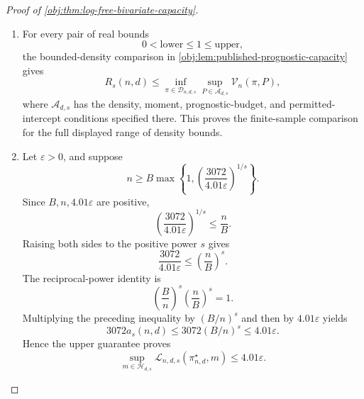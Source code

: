 \begin{proof}[Proof of \cref{obj:thm:log-free-bivariate-capacity}]
\begin{enumerate}
For every admissible \(\pi\) and every \(m\in\mathcal H_{d,s}\),
\cref{obj:lem:ht-transfer} supplies the actual-estimator identity and finiteness:
\[
n\operatorname{Var}(\widehat\theta)-4.01
=
\mathcal L_{n,d,s}(\pi,m)<\infty.
\]
Under this completion, \(\widehat\theta=\widehat T_P\). Taking the supremum over the completions of all \(m\in\mathcal H_{d,s}\) therefore gives
\[
\sup_{P\in\mathcal G_{d,s}}\mathcal V_n(\pi,P)
=
\sup_{m\in\mathcal H_{d,s}}\mathcal L_{n,d,s}(\pi,m).
\]
Taking the admissible-design infimum, and separately selecting the constructed kernel, yields
\[
\inf_{\pi\in\mathcal D_{n,d,s}}
\sup_{P\in\mathcal G_{d,s}}\mathcal V_n(\pi,P)
=R_s(n,d),
\]
\[
\sup_{P\in\mathcal G_{d,s}}
\mathcal V_n(\pi^\star_{n,d},P)
=
\sup_{m\in\mathcal H_{d,s}}
\mathcal L_{n,d,s}(\pi^\star_{n,d},m).
\]
Finally, \cref{obj:lem:published-prognostic-capacity} supplies the proper inclusion
\[
\mathcal G_{d,s}\subsetneq\mathcal Q_{d,s}.
\]

\item
For every pair of real bounds
\[
0<\mathrm{lower}\leq1\leq\mathrm{upper},
\]
the bounded-density comparison in \cref{obj:lem:published-prognostic-capacity} gives
\[
R_s(n,d)
\leq
\inf_{\pi\in\mathcal D_{n,d,s}}
\sup_{P\in\mathcal A_{d,s}}\mathcal V_n(\pi,P),
\]
where \(\mathcal A_{d,s}\) has the density, moment, prognostic-budget, and permitted-intercept conditions specified there. This proves the finite-sample comparison for the full displayed range of density bounds.

\item
Let \(\varepsilon>0\), and suppose
\[
n\geq
B\max\left\{1,
\left(\frac{3072}{4.01\varepsilon}\right)^{1/s}\right\}.
\]
Since \(B,n,4.01\varepsilon\) are positive,
\[
\left(\frac{3072}{4.01\varepsilon}\right)^{1/s}
\leq\frac nB.
\]
Raising both sides to the positive power \(s\) gives
\[
\frac{3072}{4.01\varepsilon}
\leq\left(\frac nB\right)^s.
\]
The reciprocal-power identity is
\[
\left(\frac Bn\right)^s
\left(\frac nB\right)^s=1.
\]
Multiplying the preceding inequality by \((B/n)^s\) and then by
\(4.01\varepsilon\) yields
\[
3072a_s(n,d)
\leq3072(B/n)^s
\leq4.01\varepsilon.
\]
Hence the upper guarantee proves
\[
\sup_{m\in\mathcal H_{d,s}}
\mathcal L_{n,d,s}(\pi^\star_{n,d},m)
\leq4.01\varepsilon.
\]


\end{enumerate}
\end{proof}
